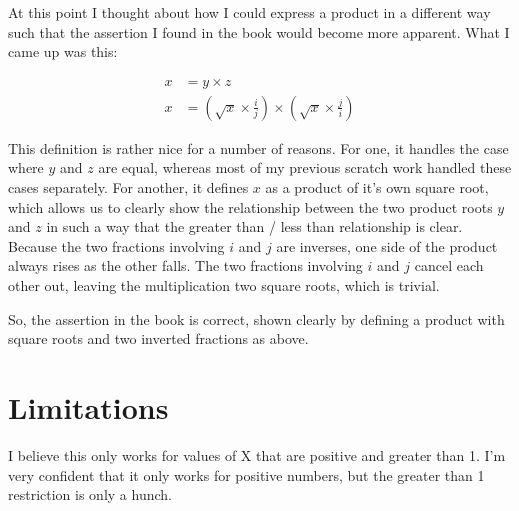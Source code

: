 \documentclass[10pt]{article}
\begin{document}
At this point I thought about how I could express a product in a different way such that the assertion I found in the book would become more apparent.  What I came up was this:

\begin{align*}
x &= y \times z \\
x &= (\sqrt{x} \times \frac{i}{j}) \times (\sqrt{x} \times \frac{j}{i})
\end{align*}

This definition is rather nice for a number of reasons.  For one, it handles the case where $y$ and $z$ are equal, whereas most of my previous scratch work handled these cases separately.  For another, it defines $x$ as a product of it's own square root, which allows us to clearly show the relationship between the two product roots $y$ and $z$ in such a way that the greater than / less than relationship is clear. Because the two fractions involving $i$ and $j$ are inverses, one side of the product always rises as the other falls. The two fractions involving $i$ and $j$ cancel each other out, leaving the multiplication two square roots, which is trivial.

So, the assertion in the book is correct, shown clearly by defining a product with square roots and two inverted fractions as above.

\section{Limitations}

I believe this only works for values of X that are positive and greater than 1.  I'm very confident that it only works for positive numbers, but the greater than 1 restriction is only a hunch.
\end{document}
